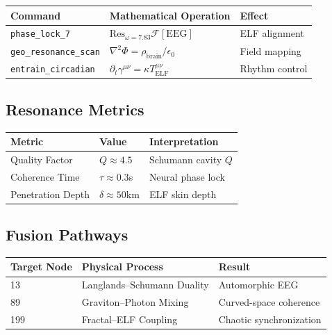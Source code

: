 \documentclass[12pt]{article}
\begin{document}
\begin{table}[h]
\centering
\begin{tabular}{|l|l|l|}
\hline
\textbf{Command} & \textbf{Mathematical Operation} & \textbf{Effect} \\ \hline
\texttt{phase\_lock\_7} & $\text{Res}_{\omega=7.83}\mathcal{F}[\text{EEG}]$ & ELF alignment \\ \hline
\texttt{geo\_resonance\_scan} & $\nabla^2 \Phi = \rho_{\text{brain}}/\epsilon_0$ & Field mapping \\ \hline
\texttt{entrain\_circadian} & $\partial_t \gamma^{\mu\nu} = \kappa T^{\mu\nu}_{\text{ELF}}$ & Rhythm control \\ \hline
\end{tabular}
\end{table}

\subsection{Resonance Metrics}

\begin{table}[h]
\centering
\begin{tabular}{|l|l|l|}
\hline
\textbf{Metric} & \textbf{Value} & \textbf{Interpretation} \\ \hline
Quality Factor & $Q \approx 4.5$ & Schumann cavity $Q$ \\ \hline
Coherence Time & $\tau \approx 0.3$s & Neural phase lock \\ \hline
Penetration Depth & $\delta \approx 50$km & ELF skin depth \\ \hline
\end{tabular}
\end{table}

\subsection{Fusion Pathways}

\begin{table}[h]
\centering
\begin{tabular}{|l|l|l|}
\hline
\textbf{Target Node} & \textbf{Physical Process} & \textbf{Result} \\ \hline
13 & Langlands–Schumann Duality & Automorphic EEG \\ \hline
89 & Graviton–Photon Mixing & Curved-space coherence \\ \hline
199 & Fractal–ELF Coupling & Chaotic synchronization \\ \hline
\end{tabular}
\end{table}
\end{document}
